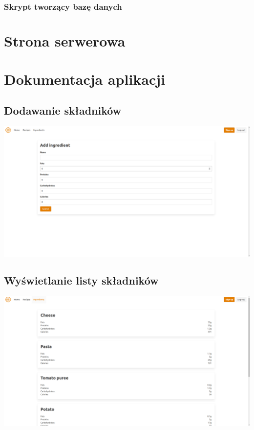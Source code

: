 \documentclass[11pt]{article}
\begin{document}
\subsubsection{Skrypt tworzący bazę danych}

\section{Strona serwerowa}

\section{Dokumentacja aplikacji}
\subsection{Dodawanie składników}
\includegraphics[width=15.5cm]{add_ingredient.png}
\subsection{Wyświetlanie listy składników}
\includegraphics[width=15.5cm]{ingredients_list.png}
\end{document}
